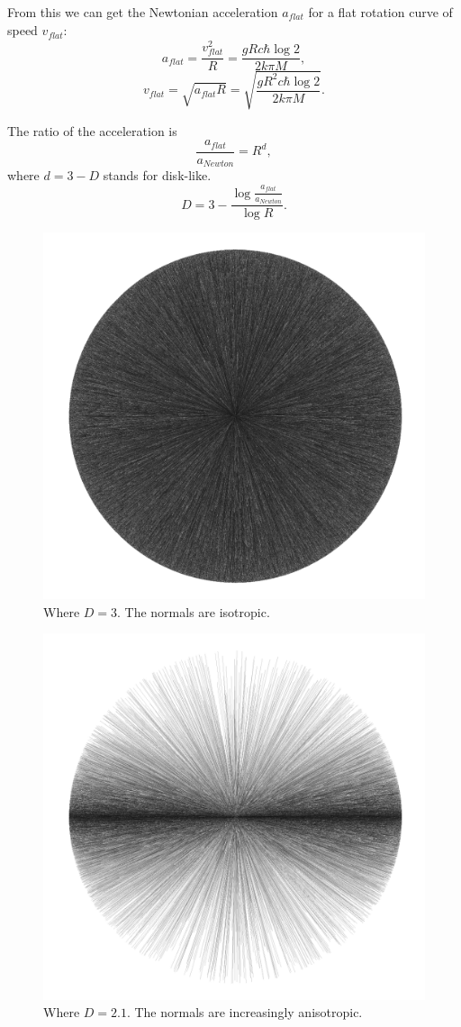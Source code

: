 \documentclass[12pt]{article}
\begin{document}
From this we can get the Newtonian acceleration $a_{\textit{flat}}$ for a flat rotation curve of speed $v_{\textit{flat}}$:
\begin{equation}
a_{\textit{flat}} = \frac{v_{\textit{flat}}^2}{R} = \frac{g R c \hbar \log 2}{2 k \pi M},
\end{equation}
\begin{equation}
v_{\textit{flat}} = \sqrt{a_{\textit{flat}} R} = \sqrt{\frac{g R^2 c \hbar \log 2}{2 k \pi M}}.
\end{equation}

The ratio of the acceleration is
\begin{equation}
\frac{a_{\textit{flat}}}{a_{\textit{Newton}}} = R^{d}, 
\end{equation}
where $d = 3 - D$ stands for disk-like.
\begin{equation}
D = 3 - \frac{\log \frac{a_{\textit{flat}}}{a_{\textit{Newton}}}}{\log R}.
\end{equation}




\begin{figure} 
\centering
\label{fig1}
  \includegraphics[width = 3 in]{3.png}
  \caption{
Where $D = 3$.
The normals are isotropic.
}
\end{figure}

\begin{figure} 
\centering
\label{fig2}
  \includegraphics[width = 3 in]{2.1.png}
  \caption{
Where $D = 2.1$.
The normals are increasingly anisotropic.
}
\end{figure}
\end{document}
